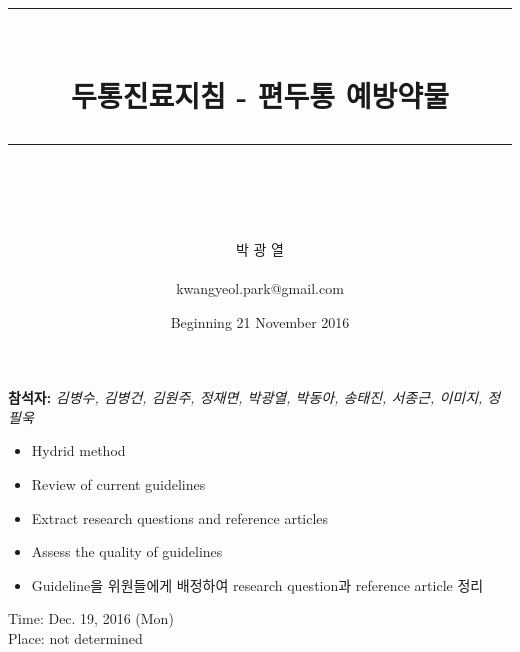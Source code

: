 \documentclass[idxtotoc,hyperref,openany, oneside]{labbook} %
\newcommand{\attend}[1]{\textbf{참석자:} \emph{#1}\\}
\newcommand{\HRule}{\rule{\linewidth}{0.5mm}} %
\begin{document}

\frontmatter %
\title{
\begin{center}
\HRule \\[0.4cm]
{\Huge \bfseries 두통진료지침 - 편두통 예방약물}\\[0.2cm] %
\HRule \\[1.5cm]
\end{center}
}
\author{\LARGE 박 광 열 \\ \\ \LARGE kwangyeol.park@gmail.com \\[2cm]} 
\date{Beginning 21 November 2016} %
\maketitle

\tableofcontents

\mainmatter %


\attend{김병수, 김병건, 김원주, 정재면, 박광열, 박동아, 송태진, 서종근, 이미지, 정필욱}

	\begin{itemize}
		\item Hydrid method
		\item Review of current guidelines 
		\item Extract research questions and reference articles
		\item Assess the quality of guidelines
	\end{itemize}

	\begin{itemize}
		\item Guideline을 위원들에게 배정하여 research question과 reference article 정리
	\end{itemize}
	
Time: Dec. 19, 2016 (Mon)\\
Place: not determined
	
\end{document}
